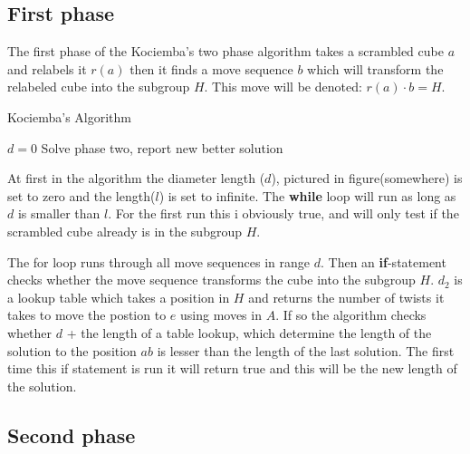 \subsection{First phase}
The first phase of the Kociemba's two phase algorithm takes a scrambled cube $a$ and relabels it $r(a)$ then it finds a move sequence $b$ which will transform the relabeled cube into the subgroup $H$. This move will be denoted: $r(a)\cdot{}b=H$. 
\begin{algorithm}                     
\caption{Kociemba's Algorithm \cite{rokicki09}}          
\label{alg:kociemba}        
\begin{algorithmic}[1]
\STATE $d=0$
				\STATE Solve phase two, report new better solution
			\ENDIF
		\ENDIF
	\ENDFOR
\ENDWHILE
\end{algorithmic}
\end{algorithm}

At first in the algorithm the diameter length ($d$), pictured in figure(somewhere) is set to zero and the length($l$) is set to infinite. The \textbf{while} loop will run as long as $d$ is smaller than $l$. For the first run this i obviously true, and will only test if the scrambled cube already is in the subgroup $H$.

The for loop runs through all move sequences in range $d$. Then an \textbf{if}-statement checks whether the move sequence transforms the cube into the subgroup $H$. $d_2$ is a lookup table which takes a position in $H$ and returns the number of twists it takes to move the postion to $e$ using moves in $A$. If so the algorithm checks whether $d$ + the length of a table lookup, which determine the length of the solution to the position $ab$ is lesser than the length of the last solution. The first time this if statement is run it will return true and this will be the new length of the solution. 

\subsection{Second phase}